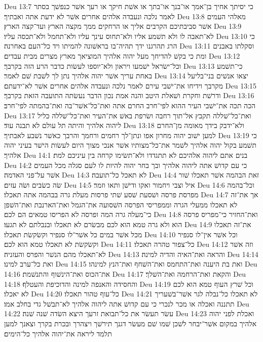 Deu 13:7  כי יסיתך אחיך בן־אמך או־בנך או־בתך או אשׁת חיקך או רעך אשׁר כנפשׁך בסתר לאמר נלכה ונעבדה אלהים אחרים אשׁר לא ידעת אתה ואבתיך׃
Deu 13:8  מאלהי העמים אשׁר סביבתיכם הקרבים אליך או הרחקים ממך מקצה הארץ ועד־קצה הארץ׃
Deu 13:9  לא־תאבה לו ולא תשׁמע אליו ולא־תחוס עינך עליו ולא־תחמל ולא־תכסה עליו׃
Deu 13:10  כי הרג תהרגנו ידך תהיה־בו בראשׁונה להמיתו ויד כל־העם באחרנה׃
Deu 13:11  וסקלתו באבנים ומת כי בקשׁ להדיחך מעל יהוה אלהיך המוציאך מארץ מצרים מבית עבדים׃
Deu 13:12  וכל־ישׂראל ישׁמעו ויראון ולא־יוספו לעשׂות כדבר הרע הזה בקרבך׃
Deu 13:13  כי־תשׁמע באחת עריך אשׁר יהוה אלהיך נתן לך לשׁבת שׁם לאמר׃
Deu 13:14  יצאו אנשׁים בני־בליעל מקרבך וידיחו את־ישׁבי עירם לאמר נלכה ונעבדה אלהים אחרים אשׁר לא־ידעתם׃
Deu 13:15  ודרשׁת וחקרת ושׁאלת היטב והנה אמת נכון הדבר נעשׂתה התועבה הזאת בקרבך׃
Deu 13:16  הכה תכה את־ישׁבי העיר ההוא לפי־חרב החרם אתה ואת־כל־אשׁר־בה ואת־בהמתה לפי־חרב׃
Deu 13:17  ואת־כל־שׁללה תקבץ אל־תוך רחבה ושׂרפת באשׁ את־העיר ואת־כל־שׁללה כליל ליהוה אלהיך והיתה תל עולם לא תבנה עוד׃
Deu 13:18  ולא־ידבק בידך מאומה מן־החרם למען ישׁוב יהוה מחרון אפו ונתן־לך רחמים ורחמך והרבך כאשׁר נשׁבע לאבתיך׃
Deu 13:19  כי תשׁמע בקול יהוה אלהיך לשׁמר את־כל־מצותיו אשׁר אנכי מצוך היום לעשׂות הישׁר בעיני יהוה אלהיך׃
Deu 14:1  בנים אתם ליהוה אלהיכם לא תתגדדו ולא־תשׂימו קרחה בין עיניכם למת׃
Deu 14:2  כי עם קדושׁ אתה ליהוה אלהיך ובך בחר יהוה להיות לו לעם סגלה מכל העמים אשׁר על־פני האדמה׃
Deu 14:3  לא תאכל כל־תועבה׃
Deu 14:4  זאת הבהמה אשׁר תאכלו שׁור שׂה כשׂבים ושׂה עזים׃
Deu 14:5  איל וצבי ויחמור ואקו ודישׁן ותאו וזמר׃
Deu 14:6  וכל־בהמה מפרסת פרסה ושׁסעת שׁסע שׁתי פרסות מעלת גרה בבהמה אתה תאכלו׃
Deu 14:7  אך את־זה לא תאכלו ממעלי הגרה וממפריסי הפרסה השׁסועה את־הגמל ואת־הארנבת ואת־השׁפן כי־מעלה גרה המה ופרסה לא הפריסו טמאים הם לכם׃
Deu 14:8  ואת־החזיר כי־מפריס פרסה הוא ולא גרה טמא הוא לכם מבשׂרם לא תאכלו ובנבלתם לא תגעו׃
Deu 14:9  את־זה תאכלו מכל אשׁר במים כל אשׁר־לו סנפיר וקשׂקשׂת תאכלו׃
Deu 14:10  וכל אשׁר אין־לו סנפיר וקשׂקשׂת לא תאכלו טמא הוא לכם׃
Deu 14:11  כל־צפור טהרה תאכלו׃
Deu 14:12  וזה אשׁר לא־תאכלו מהם הנשׁר והפרס והעזניה׃
Deu 14:13  והראה ואת־האיה והדיה למינה׃
Deu 14:14  ואת כל־ערב למינו׃
Deu 14:15  ואת בת היענה ואת־התחמס ואת־השׁחף ואת־הנץ למינהו׃
Deu 14:16  את־הכוס ואת־הינשׁוף והתנשׁמת׃
Deu 14:17  והקאת ואת־הרחמה ואת־השׁלך׃
Deu 14:18  והחסידה והאנפה למינה והדוכיפת והעטלף׃
Deu 14:19  וכל שׁרץ העוף טמא הוא לכם לא יאכלו׃
Deu 14:20  כל־עוף טהור תאכלו׃
Deu 14:21  לא תאכלו כל־נבלה לגר אשׁר־בשׁעריך תתננה ואכלה או מכר לנכרי כי עם קדושׁ אתה ליהוה אלהיך לא־תבשׁל גדי בחלב אמו׃
Deu 14:22  עשׂר תעשׂר את כל־תבואת זרעך היצא השׂדה שׁנה שׁנה׃
Deu 14:23  ואכלת לפני יהוה אלהיך במקום אשׁר־יבחר לשׁכן שׁמו שׁם מעשׂר דגנך תירשׁך ויצהרך ובכרת בקרך וצאנך למען תלמד ליראה את־יהוה אלהיך כל־הימים׃
